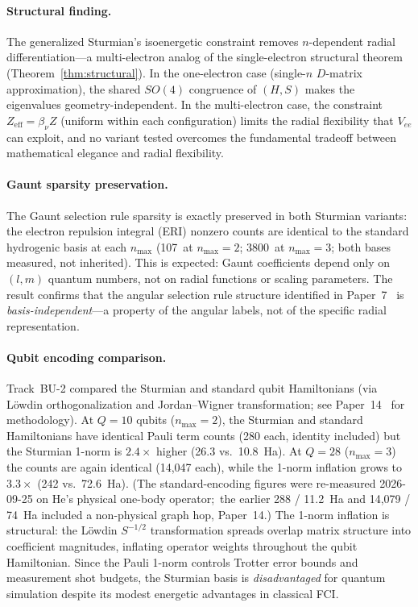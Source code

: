 \documentclass[aps,pra,twocolumn,superscriptaddress,longbibliography]{revtex4-2}
\theoremstyle{remark}
\theoremstyle{plain}
\begin{document}
\paragraph{Structural finding.}
The generalized Sturmian's isoenergetic constraint removes
$n$-dependent radial differentiation---a multi-electron analog of the
single-electron structural theorem
(Theorem~\ref{thm:structural}).  In the one-electron case (single-$n$
$D$-matrix approximation), the shared $SO(4)$ congruence of $(H,S)$ makes
the eigenvalues geometry-independent.
In the multi-electron case, the constraint
$Z_{\mathrm{eff}} = \beta_\nu Z$ (uniform within each
configuration) limits the radial flexibility that $V_{ee}$ can
exploit, and no variant tested overcomes the fundamental tradeoff
between mathematical elegance and radial flexibility.

\paragraph{Gaunt sparsity preservation.}
The Gaunt selection rule sparsity is exactly preserved in both
Sturmian variants: the electron repulsion integral (ERI) nonzero
counts are identical to the standard hydrogenic basis at each
$n_{\max}$ (107~at $n_{\max} = 2$; 3800~at $n_{\max} = 3$;
both bases measured, not inherited).
This is expected: Gaunt coefficients depend only on
$(l, m)$ quantum numbers, not on radial functions or scaling
parameters.  The result confirms that the angular selection rule
structure identified in Paper~7~\cite{loutey_paper7} is
\emph{basis-independent}---a property of the angular labels, not of
the specific radial representation.

\paragraph{Qubit encoding comparison.}
Track~BU-2 compared the Sturmian and standard qubit Hamiltonians
(via L\"owdin orthogonalization and Jordan--Wigner transformation;
see Paper~14~\cite{loutey_paper14} for methodology).
At $Q = 10$ qubits ($n_{\max} = 2$), the Sturmian and standard
Hamiltonians have identical Pauli term counts (280 each, identity
included) but the Sturmian 1-norm is $2.4\times$ higher (26.3 vs.\
10.8~Ha).  At $Q = 28$ ($n_{\max} = 3$) the counts are again
identical (14{,}047 each), while the 1-norm inflation grows to
$3.3\times$ (242 vs.\ 72.6~Ha).  (The standard-encoding figures were
re-measured 2026-09-25 on He's physical one-body operator;\ the earlier
288 / 11.2~Ha and 14{,}079 / 74~Ha included a non-physical graph hop,
Paper~14.)
The 1-norm inflation is structural: the L\"owdin $S^{-1/2}$
transformation spreads overlap matrix structure into coefficient
magnitudes, inflating operator weights throughout the qubit
Hamiltonian.  Since the Pauli 1-norm controls Trotter error bounds
and measurement shot budgets, the Sturmian basis is
\emph{disadvantaged} for quantum simulation despite its modest
energetic advantages in classical FCI.
\end{document}
